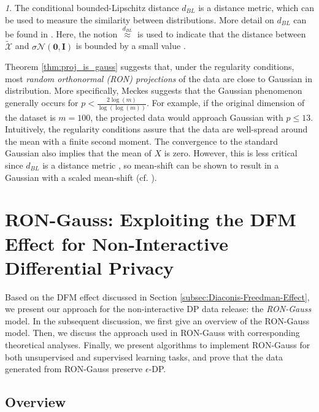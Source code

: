\documentclass[USenglish,oneside,twocolumn]{article}
\theoremstyle{definition}
\theoremstyle{remark}
\newtheorem{rem}{\protect\remarkname}
\theoremstyle{plain}
\theoremstyle{plain}
\providecommand{\remarkname}{Remark}
\begin{document}
%
\begin{rem}
The conditional bounded-Lipschitz distance $d_{BL}$ is a distance metric, which can be used to measure the similarity between distributions. More detail on $d_{BL}$ can be found in \cite{RefWorks:531}. Here, the notion $\overset{d_{BL}}{\approx}$ is used to indicate that the distance between $\widetilde{\mathcal{X}}$ and $\sigma\mathcal{N}(\mathbf{0},\mathbf{I})$ is bounded by a small value \cite{RefWorks:439}.
\end{rem}

Theorem \ref{thm:proj_is_gauss} suggests that, under the regularity
conditions, most \emph{random orthonormal (RON) projections} of the
data are close to Gaussian in distribution. More specifically, Meckes
\cite{RefWorks:439} suggests that the Gaussian phenomenon generally
occurs for $p<\frac{2\log(m)}{\log(\log(m))}$. For example, if the
original dimension of the dataset is $m=100$, the projected data
would approach Gaussian with $p\leq13$. Intuitively, the regularity
conditions assure that the data are well-spread around the mean with
a finite second moment. The convergence to the standard Gaussian also
implies that the mean of $X$ is zero. However, this is less critical
since $d_{BL}$ is a distance metric \cite{RefWorks:531}, so mean-shift
can be shown to result in a Gaussian with a scaled mean-shift
(cf. \cite{RefWorks:531,RefWorks:513}).

\vspace{-0.5em}
\section{RON-Gauss: Exploiting the DFM Effect for Non-Interactive Differential
Privacy}

\label{sec:RON-Gauss}

Based on the DFM effect discussed in Section \ref{subsec:Diaconis-Freedman-Effect},
we present our approach for the non-interactive DP data release: the
\emph{RON-Gauss} model. In the subsequent discussion, we first give
an overview of the RON-Gauss model. Then, we discuss the approach used in RON-Gauss with corresponding  theoretical analyses. Finally, we present algorithms
to implement RON-Gauss for both unsupervised and supervised
learning tasks, and prove that the data generated from RON-Gauss preserve $\epsilon$-DP.

\vspace{-1em}
\subsection{Overview \label{subsec:Overview}}
\end{document}
